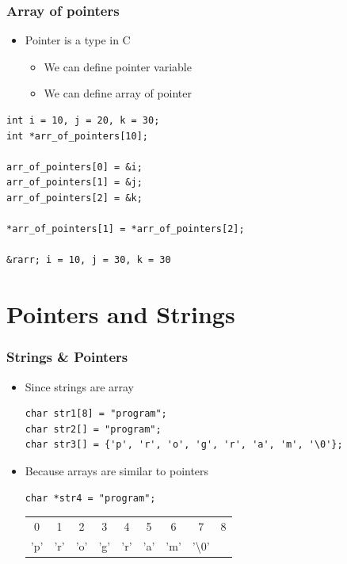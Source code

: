 \documentclass{../c-lecture}
\begin{document}
\begin{frame}[fragile]
  \frametitle{Array of pointers}
  \begin{itemize}
    \item Pointer is a type in C
    \begin{itemize}
      \item We can define pointer variable
      \item We can define array of pointer
    \end{itemize}
  \end{itemize}
  \begin{verbatim}
int i = 10, j = 20, k = 30;
int *arr_of_pointers[10];

arr_of_pointers[0] = &i;
arr_of_pointers[1] = &j;
arr_of_pointers[2] = &k;

*arr_of_pointers[1] = *arr_of_pointers[2];

&rarr; i = 10, j = 30, k = 30
  \end{verbatim}
\end{frame}

\section{Pointers and Strings}

\begin{frame}[fragile]
  \frametitle{Strings \& Pointers}
  \begin{itemize}
    \item Since strings are array
    \begin{verbatim}
char str1[8] = "program";
char str2[] = "program";
char str3[] = {'p', 'r', 'o', 'g', 'r', 'a', 'm', '\0'};
    \end{verbatim}
    \item Because arrays are similar to pointers
    \begin{verbatim}
char *str4 = "program";
    \end{verbatim}
    \begin{tabular}{*9{c}}
      0 & 1 & 2 & 3 & 4 & 5 & 6 & 7 & 8 \\
      'p' &
      'r' &
      'o' &
      'g' &
      'r' &
      'a' &
      'm' &
      '\textbackslash 0' \\
    \end{tabular}
  \end{itemize}
\end{frame}
\end{document}

